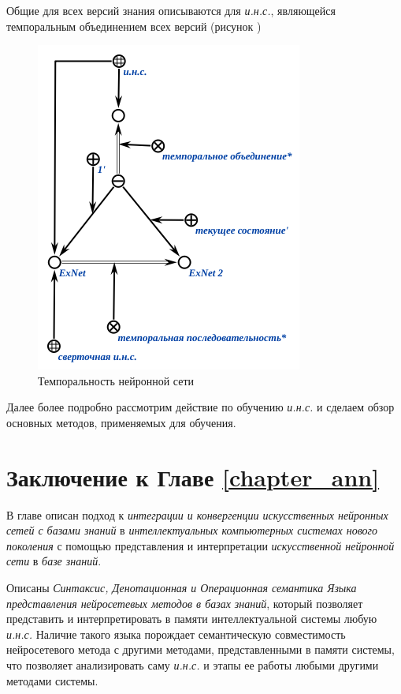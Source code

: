 Общие для всех версий знания описываются для \textit{и.н.с.}, являющейся темпоральным объединением всех версий (рисунок )

\begin{figure}[H]
	\centering
	\includegraphics[scale=0.8]{author/part3/figures/temporal_neural_network_scg.png}
	\caption{Темпоральность нейронной сети}
	\label{fig:temporal_neural_network_scg}
\end{figure}

Далее более подробно рассмотрим действие по обучению \textit{и.н.с.} и сделаем обзор основных методов, применяемых для обучения.

\section*{Заключение к Главе \ref{chapter_ann}}
В главе описан подход к \textit{интеграции и конвергенции искусственных нейронных сетей с базами знаний} в \textit{интеллектуальных компьютерных системах нового поколения} с помощью представления и интерпретации \textit{искусственной нейронной сети} в \textit{базе знаний}.

Описаны \textit{Синтаксис, Денотационная и Операционная семантика Языка представления нейросетевых методов в базах знаний}, который позволяет представить и интерпретировать в памяти интеллектуальной системы любую \textit{и.н.с.} Наличие такого языка порождает семантическую совместимость нейросетевого метода с другими методами, представленными в памяти системы, что позволяет анализировать саму \textit{и.н.с.} и этапы ее работы любыми другими методами системы.

